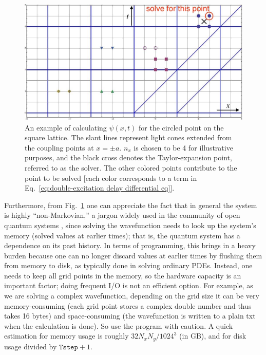 \documentclass[12pt,letter,onecolumn,notitlepage]{article}
\begin{document}
\begin{figure}[htb]
	\centering
	\includegraphics[scale=0.4]{FDTD_grid}
	\caption{An example of calculating $\psi(x,t)$ for the circled point on the square lattice. The slant lines represent light cones extended from the coupling points at $x=\pm a$. $n_x$ is chosen to be 4 for illustrative purposes, and the black cross denotes the Taylor-expansion point, referred to as the solver. The other colored points contribute to the point to be solved [each color corresponds to a term in Eq.~\eqref{eq:double-excitation delay differential eq}].}
	\label{fig:FDTD_grid}
\end{figure}

Furthermore, from Fig.~\ref{fig:FDTD_grid} one can appreciate the fact that in general the system is highly ``non-Markovian,'' a jargon widely used in the community of open quantum systems \cite{RivasRPP14,BreuerRMP16,deVegaRMP17}, since solving the wavefunction needs to look up the system's memory (solved values at earlier times); that is, the quantum system has a dependence on its past history. In terms of programming, this brings in a heavy burden because one can no longer discard values at earlier times by flushing them from memory to disk, as typically done in solving ordinary PDEs. Instead, one needs to keep all grid points in the memory, so the hardware capacity is an important factor; doing frequent I/O is not an efficient option. 
For example, as we are solving a complex wavefunction,
depending on the grid size it can be very memory-consuming (each grid point stores a complex double number and thus takes 16 bytes)
and space-consuming (the wavefunction is written to a plain txt when the calculation is done). So use the program with caution. A quick estimation for memory usage is roughly $32N_xN_y/1024^3$ (in GB), and for disk usage divided by $\texttt{Tstep}+1$.
\end{document}
